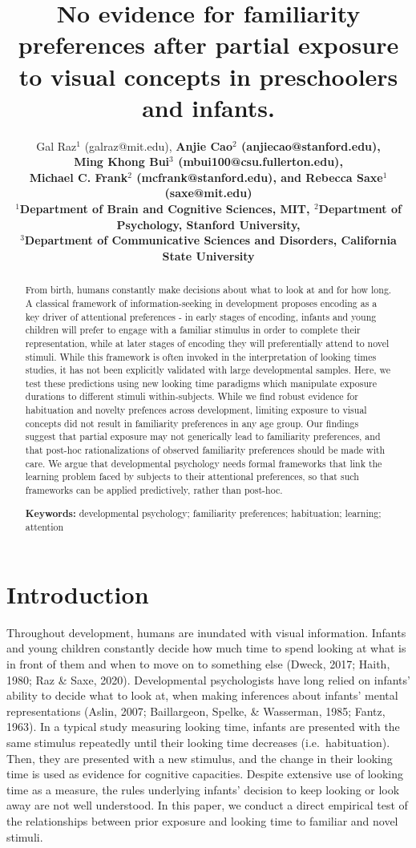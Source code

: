 \documentclass[10pt, letterpaper]{article}
\title{No evidence for familiarity preferences after partial exposure to
visual concepts in preschoolers and infants.}
\author{Gal Raz$^1$ (galraz@mit.edu), \bf{Anjie Cao$^2$  (anjiecao@stanford.edu)},\\ \bf{Ming Khong Bui$^3$  (mbui100@csu.fullerton.edu)}, \\ \bf{Michael C. Frank$^2$ (mcfrank@stanford.edu)},
 and \bf{Rebecca Saxe$^1$ (saxe@mit.edu)} \\
$^1$Department of Brain and Cognitive Sciences, MIT, $^2$Department of Psychology, Stanford University, \\ $^3$Department of Communicative Sciences and Disorders, California State University \\ }
\begin{document}
\maketitle

\begin{abstract}
From birth, humans constantly make decisions about what to look at and
for how long. A classical framework of information-seeking in
development proposes encoding as a key driver of attentional preferences
- in early stages of encoding, infants and young children will prefer to
engage with a familiar stimulus in order to complete their
representation, while at later stages of encoding they will
preferentially attend to novel stimuli. While this framework is often
invoked in the interpretation of looking times studies, it has not been
explicitly validated with large developmental samples. Here, we test
these predictions using new looking time paradigms which manipulate
exposure durations to different stimuli within-subjects. While we find
robust evidence for habituation and novelty prefences across
development, limiting exposure to visual concepts did not result in
familiarity preferences in any age group. Our findings suggest that
partial exposure may not generically lead to familiarity preferences,
and that post-hoc rationalizations of observed familiarity preferences
should be made with care. We argue that developmental psychology needs
formal frameworks that link the learning problem faced by subjects to
their attentional preferences, so that such frameworks can be applied
predictively, rather than post-hoc.

\textbf{Keywords:}
developmental psychology; familiarity preferences; habituation;
learning; attention
\end{abstract}

\hypertarget{introduction}{%
\section{Introduction}\label{introduction}}

Throughout development, humans are inundated with visual information.
Infants and young children constantly decide how much time to spend
looking at what is in front of them and when to move on to something
else (Dweck, 2017; Haith, 1980; Raz \& Saxe, 2020). Developmental
psychologists have long relied on infants' ability to decide what to
look at, when making inferences about infants' mental representations
(Aslin, 2007; Baillargeon, Spelke, \& Wasserman, 1985; Fantz, 1963). In
a typical study measuring looking time, infants are presented with the
same stimulus repeatedly until their looking time decreases
(i.e.~habituation). Then, they are presented with a new stimulus, and
the change in their looking time is used as evidence for cognitive
capacities. Despite extensive use of looking time as a measure, the
rules underlying infants' decision to keep looking or look away are not
well understood. In this paper, we conduct a direct empirical test of
the relationships between prior exposure and looking time to familiar
and novel stimuli.
\end{document}
